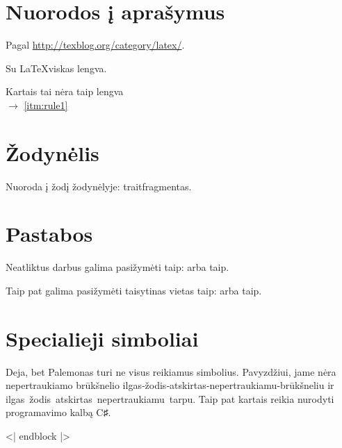 \section{Nuorodos į aprašymus}

Pagal \url{http://texblog.org/category/latex/}.

\begin{description}[style=multiline, labelwidth=2.0cm]
	\item[\namedlabel{itm:rule1}{1 taisyklė}] Su \LaTeX viskas lengva.
	\item[\namedlabel{itm:rule2}{2 taisyklė}] Kartais tai nėra taip lengva\\
		$\to$ \ref{itm:rule1}
\end{description}

\section{Žodynėlis}

Nuoroda į žodį žodynėlyje: \gls{trait}{fragmentas}.

\section{Pastabos}

Neatliktus darbus galima pasižymėti taip: 
arba taip.

Taip pat galima pasižymėti taisytinas vietas taip:  arba taip.

\section{Specialieji simboliai}

\begin{sloppypar}
  Deja, bet Palemonas turi ne visus reikiamus simbolius. Pavyzdžiui,
  jame nėra nepertraukiamo brūkšnelio
  ilgas‑žodis‑atskirtas‑nepertraukiamu‑brūkšneliu ir
  ilgas žodis atskirtas nepertraukiamu tarpu.
  Taip pat kartais reikia nurodyti programavimo kalbą C♯.
\end{sloppypar}

<| endblock |>
